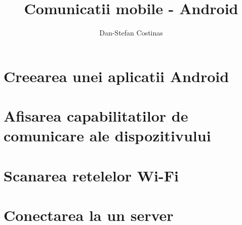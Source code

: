 \documentclass[12pt,a4paper,twoside]{article}
\title{Comunicatii mobile - Android}
\author{Dan-Stefan Costinas}
\begin{document}
\maketitle
\newpage
\tableofcontents

\section{Creearea unei aplicatii Android}

\section{Afisarea capabilitatilor de comunicare ale dispozitivului}
\section{Scanarea retelelor Wi-Fi}
\section{Conectarea la un server}
%
\end{document}
